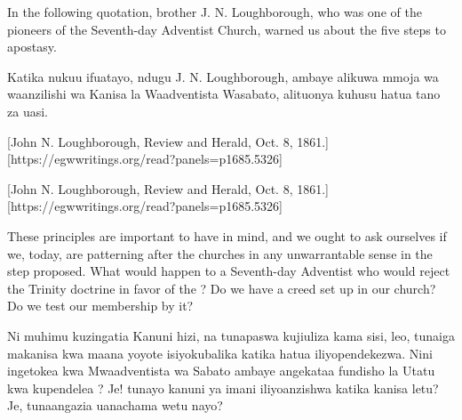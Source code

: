 



In the following quotation, brother J. N. Loughborough, who was one of the pioneers of the Seventh-day Adventist Church, warned us about the five steps to apostasy.


Katika nukuu ifuatayo, ndugu J. N. Loughborough, ambaye alikuwa mmoja wa waanzilishi wa Kanisa la Waadventista Wasabato, alituonya kuhusu hatua tano za uasi.


[John N. Loughborough, Review and Herald, Oct. 8, 1861.][https://egwwritings.org/read?panels=p1685.5326]


[John N. Loughborough, Review and Herald, Oct. 8, 1861.][https://egwwritings.org/read?panels=p1685.5326]


These principles are important to have in mind, and we ought to ask ourselves if we, today, are patterning after the churches in any unwarrantable sense in the step proposed. What would happen to a Seventh-day Adventist who would reject the Trinity doctrine in favor of the ? Do we have a creed set up in our church? Do we test our membership by it?


Ni muhimu kuzingatia Kanuni hizi, na tunapaswa kujiuliza kama sisi, leo, tunaiga makanisa kwa maana yoyote isiyokubalika katika hatua iliyopendekezwa. Nini ingetokea kwa Mwaadventista wa Sabato ambaye angekataa fundisho la Utatu kwa kupendelea ? Je! tunayo kanuni ya imani iliyoanzishwa katika kanisa letu? Je, tunaangazia uanachama wetu nayo?



